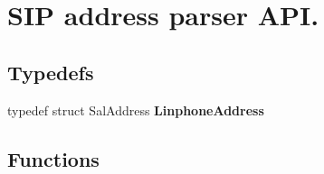 \section{\-S\-I\-P address parser \-A\-P\-I.}
\label{group__linphone__address}
\subsection*{\-Typedefs}
\begin{DoxyCompactItemize}
\item 
typedef struct \-Sal\-Address {\bf \-Linphone\-Address}
\end{DoxyCompactItemize}
\subsection*{\-Functions}
